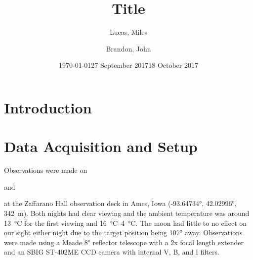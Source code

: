 \documentclass[%
aip,
jmp,
reprint,
floatfix,
nofootinbib
]{revtex4-1}
\begin{document}
	
	\title[Short title]{Title}
	
	\author{Lucas, Miles}
	\author{Brandon, John}
	
	\date{\today}
	
	

	\begin{abstract}
	
		
	\end{abstract}
	
	\maketitle
	

	\section{Introduction}
	
	
	\begin{table}[t]
		\centering
		\label{tab:info}
		
	\end{table}
	


	\section{Data Acquisition and Setup}
	Observations were made on \date{27 September 2017} and \date{18 October 2017} at the Zaffarano Hall observation deck in Ames, Iowa (\ang{-93.64734}, \ang{42.02996}, \SI{342}{\meter}). Both nights had clear viewing and the ambient temperature was around \SI{13}{\degreeCelsius} for the first viewing and \SIrange{16}{4}{\degreeCelsius}. The moon had little to no effect on our sight either night due to the target position being \ang{107} away. Observations were made using a Meade 8" reflector telescope with a 2x focal length extender and an SBIG ST-402ME CCD camera with internal V, B, and I filters. 
	
\end{document}
